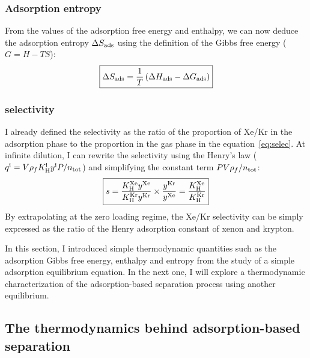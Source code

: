 \documentclass[main.tex]{subfiles}
\begin{document}
\subsubsection{Adsorption entropy}

From the values of the adsorption free energy and enthalpy, we can now deduce the adsorption entropy $\Delta S_{\text{ads}}$ using the definition of the Gibbs free energy ($G = H-TS$):
\begin{equation}\label{eq:ads_entropy}
  \boxed{
  \Delta S_{\text{ads}} = \dfrac{1}{T} \left(\Delta H_{\text{ads}} - \Delta G_{\text{ads}} \right)
  }
\end{equation}

\subsubsection{selectivity}

I already defined the selectivity as the ratio of the proportion of Xe/Kr in the adsorption phase to the proportion in the gas phase in the equation~\ref{eq:selec}. At infinite dilution, I can rewrite the selectivity using the Henry's law ($q^{\text{i}}=V\rho_f K_{\text{H}}^{\text{i}}y^{\text{i}}P/n_{\text{tot}}$) and simplifying the constant term $PV\rho_f/n_{\text{tot}}$:
\begin{equation}\label{eq:selec_0}
  \boxed{
  s = \dfrac{K_{\text{H}}^{\text{Xe}}y^{\text{Xe}}}{K_{\text{H}}^{\text{Kr}}y^{\text{Kr}}}\times\dfrac{y^{\text{Kr}}}{y^{\text{Xe}}} = \dfrac{K_{\text{H}}^{\text{Xe}}}{K_{\text{H}}^{\text{Kr}}}
  }
\end{equation}
By extrapolating at the zero loading regime, the Xe/Kr selectivity can be simply expressed as the ratio of the Henry adsorption constant of xenon and krypton.

In this section, I introduced simple thermodynamic quantities such as the adsorption Gibbs free energy, enthalpy and entropy from the study of a simple adsorption equilibrium equation. In the next one, I will explore a thermodynamic characterization of the adsorption-based separation process using another equilibrium. 

\subsection{The thermodynamics behind adsorption-based separation}\label{sct:thermo}
\end{document}

